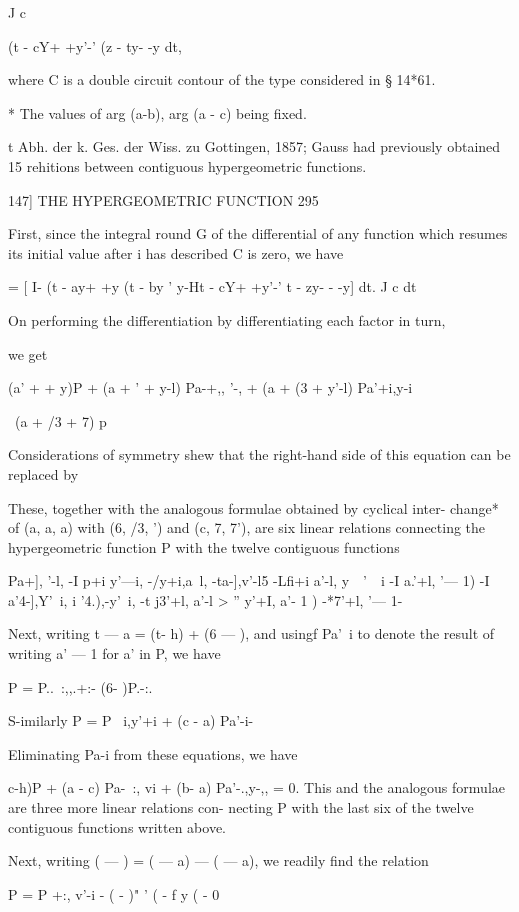 J c

(t - cY+ +y'-' (z - ty- -y dt,

where C is a double circuit contour of the type considered in § 14*61.

* The values of arg (a-b), arg (a - c) being fixed.

t Abh. der k. Ges. der Wiss. zu Gottingen, 1857; Gauss had previously
obtained 15 rehitions between contiguous hypergeometric functions.

147] THE HYPERGEOMETRIC FUNCTION 295

First, since the integral round G of the differential of any function
which resumes its initial value after i has described C is zero, we
have

= [ I- (t - ay+ +y (t - by ' y-Ht - cY+ +y'-' t - zy- - -y] dt. J c dt

On performing the differentiation by differentiating each factor in
turn,

we get

(a' + + y)P + (a + ' + y-l) Pa-+,, '-, + (a + (3 + y'-l) Pa'+i,y-i

\ (a + /3 + 7) p

Considerations of symmetry shew that the right-hand side of this
equation can be replaced by

These, together with the analogous formulae obtained by cyclical
inter- change* of (a, a, a) with (6, /3, ') and (c, 7, 7'), are six
linear relations connecting the hypergeometric function P with the
twelve contiguous functions

Pa+], '-l, -I p+i y'—i, -/y+i,a\ l, -ta-],v'-l5 -Lfi+i a'-l, y~\, '~\
i -I a.'+l, '— 1) -I a'4-],Y'\ i, i '4.),-y'\ i, -t j3'+l, a'-l > ''
y'+I, a'- 1 ) -*7'+l, '— 1-

Next, writing t — a = (t- h) + (6 — ), and usingf Pa'\ i to denote the
result of writing a' — 1 for a' in P, we have

P = P..\ :,,.+:- (6- )P.-:.

S-imilarly P = P \ i,y'+i + (c - a) Pa'-i-

Eliminating Pa-i from these equations, we have

 c-h)P + (a - c) Pa-\ :, vi + (b- a) Pa'-.,y-,, = 0. This and the
analogous formulae are three more linear relations con- necting P with
the last six of the twelve contiguous functions written above.

Next, writing ( — ) = ( — a) — ( — a), we readily find the relation

P = P +:, v'-i - ( - )" ' ( - f y ( - 0

